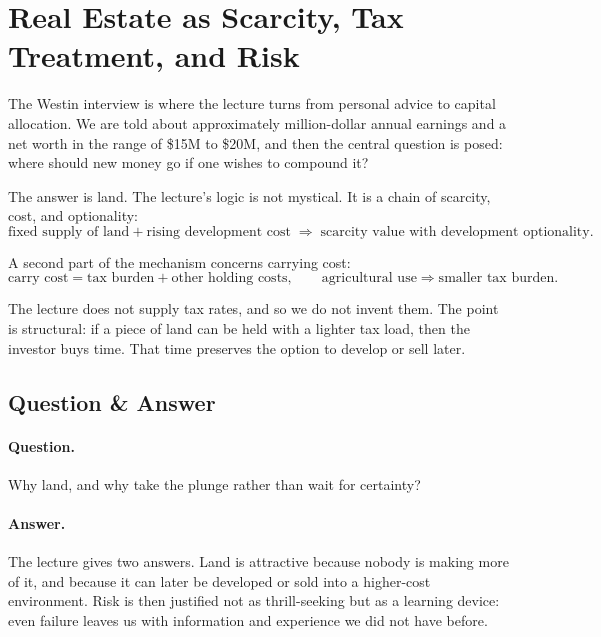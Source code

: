 \section{Real Estate as Scarcity, Tax Treatment, and Risk}

The Westin interview is where the lecture turns from personal advice to capital allocation. We are told about approximately million-dollar annual earnings and a net worth in the range of \$15M to \$20M, and then the central question is posed: where should new money go if one wishes to compound it?

The answer is land. The lecture's logic is not mystical. It is a chain of scarcity, cost, and optionality:
\begin{equation}
\text{fixed supply of land} + \text{rising development cost}
\;\Longrightarrow\;
\text{scarcity value with development optionality}.
\end{equation}

A second part of the mechanism concerns carrying cost:
\begin{equation}
\text{carry cost} = \text{tax burden} + \text{other holding costs},
\qquad
\text{agricultural use} \Rightarrow \text{smaller tax burden}.
\end{equation}

The lecture does not supply tax rates, and so we do not invent them. The point is structural: if a piece of land can be held with a lighter tax load, then the investor buys time. That time preserves the option to develop or sell later.

\subsection{Question \& Answer}

\paragraph{Question.} Why land, and why take the plunge rather than wait for certainty?

\paragraph{Answer.} The lecture gives two answers. Land is attractive because nobody is making more of it, and because it can later be developed or sold into a higher-cost environment. Risk is then justified not as thrill-seeking but as a learning device: even failure leaves us with information and experience we did not have before.

